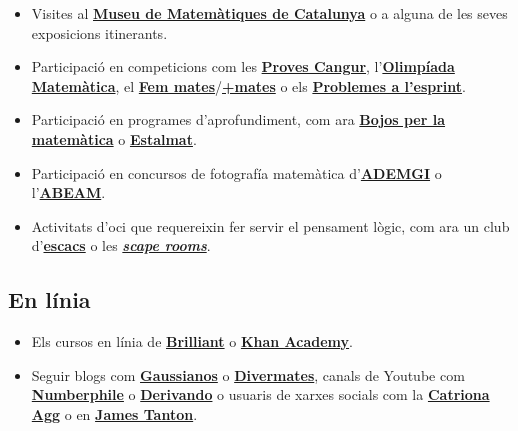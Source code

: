 \documentclass[a4paper, 12pt]{article}
\begin{document}
            \begin{itemize}
                \item Visites al \href{https://mmaca.cat/}{\textbf{Museu de Matemàtiques de Catalunya}} o a alguna de les seves exposicions itinerants.
                \item Participació en competicions com les \href{https://www.cangur.org/}{\textbf{Proves Cangur}}, l'\href{https://www.cangur.org/olimpiades/}{\textbf{Olimpíada Matemàtica}}, el \href{https://fm.feemcat.org/}{\textbf{Fem mates}}/\href{https://sites.google.com/view/mesmates/inici}{\textbf{+mates}} o els \href{https://feemcat.org/category/activitats-alumnes/esprint/}{\textbf{Problemes a l'esprint}}.
                \item Participació en programes d'aprofundiment, com ara \href{https://feemcat.org/bojos/}{\textbf{Bojos per la matemàtica}} o \href{http://www.estalmat.cat/}{\textbf{Estalmat}}.
                \item Participació en concursos de fotografía matemàtica d'\href{https://ademgi.feemcat.org/multimatge/}{\textbf{ADEMGI}} o l'\href{https://fotografiamatematica.cat/}{\textbf{ABEAM}}.
                \item Activitats d'oci que requereixin fer servir el pensament lògic, com ara un club d'\href{https://escacs.cat/}{\textbf{escacs}} o les \href{https://ca.wikipedia.org/wiki/Joc_d\%27escapada_en_viu}{\textbf{\emph{scape rooms}}}.
            \end{itemize}

        \subsection*{En línia}

            \begin{itemize}
                \item Els cursos en línia de \href{https://brilliant.org/courses/}{\textbf{Brilliant}} o \href{https://es.khanacademy.org/}{\textbf{Khan Academy}}.
                \item Seguir blogs com \href{https://www.gaussianos.com/}{\textbf{Gaussianos}} o \href{http://divermates.es/blog/}{\textbf{Divermates}}, canals de Youtube com \href{https://www.youtube.com/channel/UCoxcjq-8xIDTYp3uz647V5A}{\textbf{Numberphile}} o \href{https://www.youtube.com/channel/UCH-Z8ya93m7_RD02WsCSZYA}{\textbf{Derivando}} o usuaris de xarxes socials com la \href{https://twitter.com/Cshearer41}{\textbf{Catriona Agg}} o en \href{https://twitter.com/jamestanton}{\textbf{James Tanton}}.
            \end{itemize}
\end{document}
